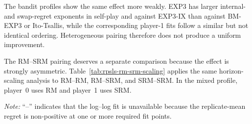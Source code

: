 The bandit profiles show the same effect more weakly. EXP3 has larger internal-
and swap-regret exponents in self-play and against EXP3-IX than against
BM-EXP3 or Ito-Tsallis, while the corresponding player-1 fits follow a similar
but not identical ordering. Heterogeneous pairing therefore does not produce a
uniform improvement.

The RM--SRM pairing deserves a separate comparison because the effect is
strongly asymmetric. Table~\ref{tab:rpsls-rm-srm-scaling} applies the same
horizon-scaling analysis to RM--RM, RM--SRM, and SRM--SRM. In the mixed
profile, player~0 uses RM and player~1 uses SRM.

\begin{table}[H]
    \centering
    \small
    \caption{
        Empirical horizon-scaling parameters for the RM/SRM RPSLS profiles.
        For each player and regret notion, the replicate-mean final cumulative
        action regret is fitted by $R_T \approx cT^\alpha$ over independently
        configured horizons from $10^3$ to $10^6$.
    }
    \label{tab:rpsls-rm-srm-scaling}


    \vspace{0.5em}
    \begin{minipage}{0.95\textwidth}
        \footnotesize
        \textit{Note:} ``--'' indicates that the log--log fit is unavailable
        because the replicate-mean regret is non-positive at one or more
        required fit points.
    \end{minipage}
\end{table}

